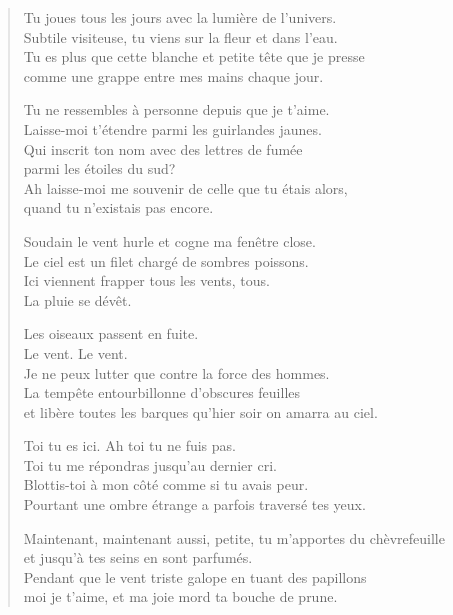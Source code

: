 \documentclass[11pt,a4paper]{book}
\begin{document}
\bigskip

\begin{verse}
  Tu joues tous les jours avec la lumière de l'univers. \\
  Subtile visiteuse, tu viens sur la fleur et dans l'eau. \\
  Tu es plus que cette blanche et petite tête que je presse \\
  comme une grappe entre mes mains chaque jour.

  Tu ne ressembles à personne depuis que je t'aime. \\
  Laisse-moi t'étendre parmi les guirlandes jaunes. \\
  Qui inscrit ton nom avec des lettres de fumée \\
  parmi les étoiles du sud? \\
  Ah laisse-moi me souvenir de celle que tu étais alors, \\
  quand tu n'existais pas encore.

  Soudain le vent hurle et cogne ma fenêtre close. \\
  Le ciel est un filet chargé de sombres poissons. \\
  Ici viennent frapper tous les vents, tous. \\
  La pluie se dévêt.

  Les oiseaux passent en fuite. \\
  Le vent. Le vent. \\
  Je ne peux lutter que contre la force des hommes. \\
  La tempête entourbillonne d'obscures feuilles \\
  et libère toutes les barques qu'hier soir on amarra au ciel.

  Toi tu es ici. Ah toi tu ne fuis pas. \\
  Toi tu me répondras jusqu'au dernier cri. \\
  Blottis-toi à mon côté comme si tu avais peur. \\
  Pourtant une ombre étrange a parfois traversé tes yeux.

  Maintenant, maintenant aussi, petite, tu m'apportes du chèvrefeuille \\
  et jusqu'à tes seins en sont parfumés. \\
  Pendant que le vent triste galope en tuant des papillons \\
  moi je t'aime, et ma joie mord ta bouche de prune.


\end{verse}
\end{document}
